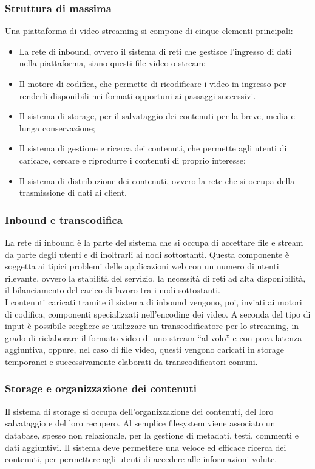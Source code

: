 			\subsubsection{Struttura di massima}
			Una piattaforma di video streaming si compone di cinque elementi principali:
			\begin{itemize}
						\item La rete di inbound, ovvero il sistema di reti che gestisce l'ingresso di dati nella piattaforma, siano questi file video o stream;
						\item Il motore di codifica, che permette di ricodificare i video in ingresso per renderli disponibili nei formati opportuni ai passaggi successivi.
						\item Il sistema di storage, per il salvataggio dei contenuti per la breve, media e lunga conservazione;
						\item Il sistema di gestione e ricerca dei contenuti, che permette agli utenti di caricare, cercare e riprodurre i contenuti di proprio interesse;
						\item Il sistema di distribuzione dei contenuti, ovvero la rete che si occupa della trasmissione di dati ai client.
			\end{itemize}

			\subsubsection{Inbound e transcodifica}
			La rete di inbound è la parte del sistema che si occupa di accettare file e stream da parte degli utenti e di inoltrarli ai nodi sottostanti. Questa componente è soggetta ai tipici problemi delle applicazioni web con un numero di utenti rilevante, ovvero la stabilità del servizio, la necessità di reti ad alta disponibilità, il bilanciamento del carico di lavoro tra i nodi sottostanti.
			\\
			I contenuti caricati tramite il sistema di inbound vengono, poi, inviati ai motori di codifica, componenti specializzati nell'encoding dei video. A seconda del tipo di input è possibile scegliere se utilizzare un transcodificatore per lo streaming, in grado di rielaborare il formato video di uno stream ``al volo'' e con poca latenza aggiuntiva, oppure, nel caso di file video, questi vengono caricati in storage temporanei e successivamente elaborati da transcodificatori comuni.

			\subsubsection{Storage e organizzazione dei contenuti}
			Il sistema di storage si occupa dell'organizzazione dei contenuti, del loro salvataggio e del loro recupero. Al semplice filesystem viene associato un database, spesso non relazionale, per la gestione di metadati, testi, commenti e dati aggiuntivi. Il sistema deve permettere una veloce ed efficace ricerca dei contenuti, per permettere agli utenti di accedere alle informazioni volute.

